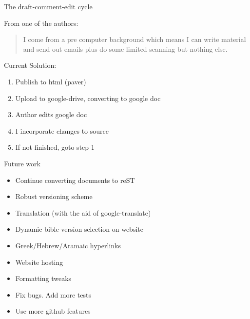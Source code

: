 \documentclass{beamer}
\begin{document}
\begin{frame}[fragile]{The draft-comment-edit cycle}

From one of the authors:

\begin{quote}
I come from a pre computer background which means I can write material and
send out emails plus do some limited scanning but nothing else.
\end{quote}


Current Solution:

\begin{enumerate}
\item Publish to html (paver)
\item Upload to google-drive, converting to google doc
\item Author edits google doc
\item I incorporate changes to \rst source 
\item If not finished, goto step 1
\end{enumerate}


\end{frame}


\begin{frame}{Future work}
\begin{itemize}
\item Continue converting documents to reST
\item Robust versioning scheme
\item Translation (with the aid of google-translate)
\item Dynamic bible-version selection on website
\item Greek/Hebrew/Aramaic hyperlinks
\item Website hosting
\item Formatting tweaks
\item Fix bugs. Add more tests
\item Use more github features
\end{itemize}

\end{frame}
\end{document}
